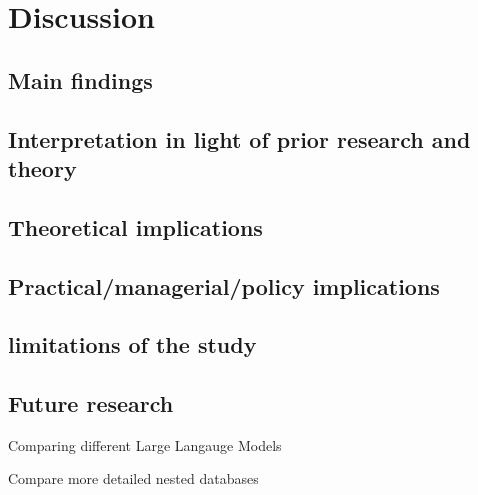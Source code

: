 \chapter{Discussion} \label{ch:discussion}

\section{Main findings}

\section{Interpretation in light of prior research and theory}

\section{Theoretical implications}

\section{Practical/managerial/policy implications}

\section{limitations of the study}

\section{Future research}

Comparing different Large Langauge Models

Compare more detailed nested databases

